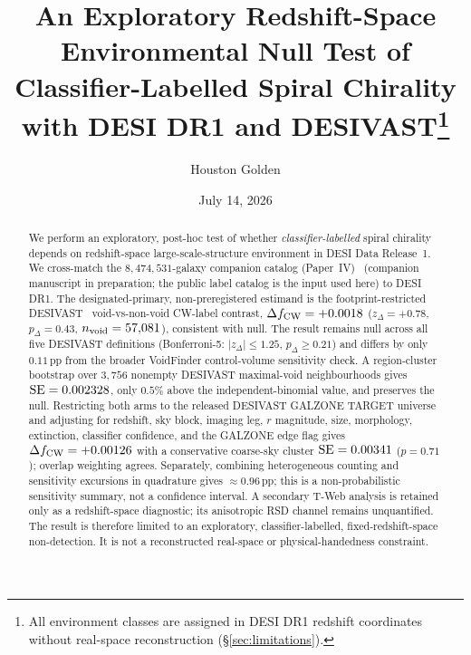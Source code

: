 \documentclass[aps,prd,twocolumn,superscriptaddress,showpacs,preprintnumbers,nofootinbib,longbibliography,floatfix]{revtex4-2}
\newcommand{\paperIVarxiv}{companion manuscript in preparation}
\begin{document}
\title{An Exploratory Redshift-Space Environmental Null Test of Classifier-Labelled Spiral Chirality with DESI DR1 and DESIVAST\protect\footnote{All environment classes are assigned in DESI DR1 redshift coordinates without real-space reconstruction (\S\ref{sec:limitations}).}}

\author{Houston Golden}

\date{July 14, 2026}

\begin{abstract}
We perform an exploratory, post-hoc test of whether
\emph{classifier-labelled} spiral chirality depends on redshift-space
large-scale-structure environment in DESI Data Release~1. We cross-match
the $8{,}474{,}531$-galaxy companion catalog
(Paper~IV)~\cite{golden_chirality_2026} (\paperIVarxiv; the public label
catalog is the input used here) to DESI DR1. The designated-primary, non-preregistered
estimand is the footprint-restricted DESIVAST~\cite{DESIVAST2025}
void-vs-non-void CW-label contrast,
$\Delta f_{\rm CW}=+0.0018$ ($z_\Delta=+0.78$, $p_\Delta=0.43$,
$n_{\rm void}=57{,}081$), consistent with null. The result remains null
across all five DESIVAST definitions (Bonferroni-5:
$|z_\Delta|\le1.25$, $p_\Delta\ge0.21$) and differs by only $0.11$\,pp
from the broader VoidFinder control-volume sensitivity check. A
region-cluster bootstrap over $3{,}756$ nonempty DESIVAST maximal-void
neighbourhoods gives ${\rm SE}=0.002328$, only $0.5\%$ above the
independent-binomial value, and preserves the null. Restricting both arms to
the released DESIVAST GALZONE TARGET universe and adjusting for redshift,
sky block, imaging leg, $r$ magnitude, size, morphology, extinction,
classifier confidence, and the GALZONE edge flag gives
$\Delta f_{\rm CW}=+0.00126$ with a conservative coarse-sky cluster
${\rm SE}=0.00341$ ($p=0.71$); overlap weighting agrees. Separately, combining
heterogeneous counting and sensitivity excursions in quadrature gives
${\approx}0.96$\,pp; this is a non-probabilistic sensitivity summary, not
a confidence interval. A secondary T-Web analysis is retained only as a
redshift-space diagnostic; its anisotropic RSD channel remains
unquantified. The result is therefore limited to an exploratory,
classifier-labelled, fixed-redshift-space non-detection. It is not a
reconstructed real-space or physical-handedness constraint.
\end{abstract}
\maketitle
\end{document}
